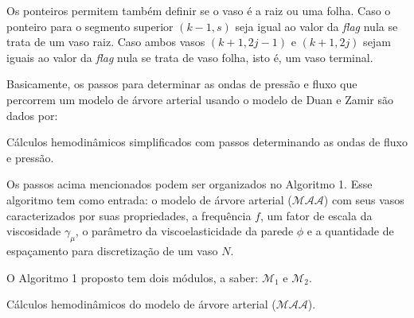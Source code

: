 Os ponteiros permitem também definir se o vaso é a raiz ou uma folha. Caso o ponteiro para o segmento superior $(k-1,s)$ seja igual ao valor da \textit{flag} nula se trata de um vaso raiz. Caso ambos vasos  $(k+1,2j-1)$ e $(k+1,2j)$ sejam iguais ao valor da \textit{flag} nula se trata de vaso folha, isto é, um vaso terminal.

Basicamente, os passos para determinar as ondas de pressão e fluxo que percorrem um modelo de árvore arterial usando o modelo de Duan e Zamir são dados por:

\begin{algorithm}[H]
	\SetAlgoLined
	\caption{Cálculos hemodinâmicos simplificados com passos determinando as ondas de fluxo e pressão.}
	\label{algsimples}
\end{algorithm}

Os passos acima mencionados podem ser organizados no Algoritmo 1. Esse algoritmo tem como entrada: o modelo de árvore arterial ($\mathcal{MAA}$) com seus vasos caracterizados por suas propriedades, a frequência $f$, um fator de escala da viscosidade $\gamma_{\mu}$, o parâmetro da viscoelasticidade da parede $\phi$ e a quantidade de espaçamento para discretização de um vaso $N$.

O Algoritmo 1 proposto tem dois módulos, a saber: $\mathcal{M}_1$ e $\mathcal{M}_2$.

\begin{algorithm}[H]
	\SetAlgoLined
	\caption{Cálculos hemodinâmicos do modelo de árvore arterial ($\mathcal{MAA}$).}
\end{algorithm}

